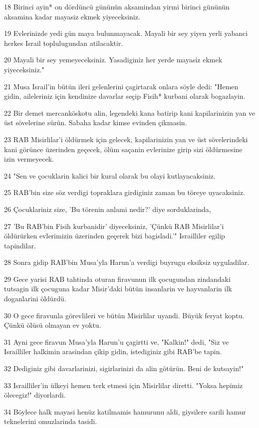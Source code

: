 \par 18 Birinci ayin* on dördüncü gününün aksamindan yirmi birinci gününün aksamina kadar mayasiz ekmek yiyeceksiniz.
\par 19 Evlerinizde yedi gün maya bulunmayacak. Mayali bir sey yiyen yerli yabanci herkes Israil toplulugundan atilacaktir.
\par 20 Mayali bir sey yemeyeceksiniz. Yasadiginiz her yerde mayasiz ekmek yiyeceksiniz."
\par 21 Musa Israil'in bütün ileri gelenlerini çagirtarak onlara söyle dedi: "Hemen gidin, aileleriniz için kendinize davarlar seçip Fisih* kurbani olarak bogazlayin.
\par 22 Bir demet mercanköskotu alin, legendeki kana batirip kani kapilarinizin yan ve üst sövelerine sürün. Sabaha kadar kimse evinden çikmasin.
\par 23 RAB Misirlilar'i öldürmek için gelecek, kapilarinizin yan ve üst sövelerindeki kani görünce üzerinden geçecek, ölüm saçanin evlerinize girip sizi öldürmesine izin vermeyecek.
\par 24 "Sen ve çocuklarin kalici bir kural olarak bu olayi kutlayacaksiniz.
\par 25 RAB'bin size söz verdigi topraklara girdiginiz zaman bu töreye uyacaksiniz.
\par 26 Çocuklariniz size, 'Bu törenin anlami nedir?' diye sorduklarinda,
\par 27 'Bu RAB'bin Fisih kurbanidir' diyeceksiniz, 'Çünkü RAB Misirlilar'i öldürürken evlerimizin üzerinden geçerek bizi bagisladi.'" Israilliler egilip tapindilar.
\par 28 Sonra gidip RAB'bin Musa'yla Harun'a verdigi buyrugu eksiksiz uyguladilar.
\par 29 Gece yarisi RAB tahtinda oturan firavunun ilk çocugundan zindandaki tutsagin ilk çocuguna kadar Misir'daki bütün insanlarin ve hayvanlarin ilk doganlarini öldürdü.
\par 30 O gece firavunla görevlileri ve bütün Misirlilar uyandi. Büyük feryat koptu. Çünkü ölüsü olmayan ev yoktu.
\par 31 Ayni gece firavun Musa'yla Harun'u çagirtti ve, "Kalkin!" dedi, "Siz ve Israilliler halkimin arasindan çikip gidin, istediginiz gibi RAB'be tapin.
\par 32 Dediginiz gibi davarlarinizi, sigirlarinizi da alin götürün. Beni de kutsayin!"
\par 33 Israilliler'in ülkeyi hemen terk etmesi için Misirlilar diretti. "Yoksa hepimiz ölecegiz!" diyorlardi.
\par 34 Böylece halk mayasi henüz katilmamis hamurunu aldi, giysilere sarili hamur teknelerini omuzlarinda tasidi.

